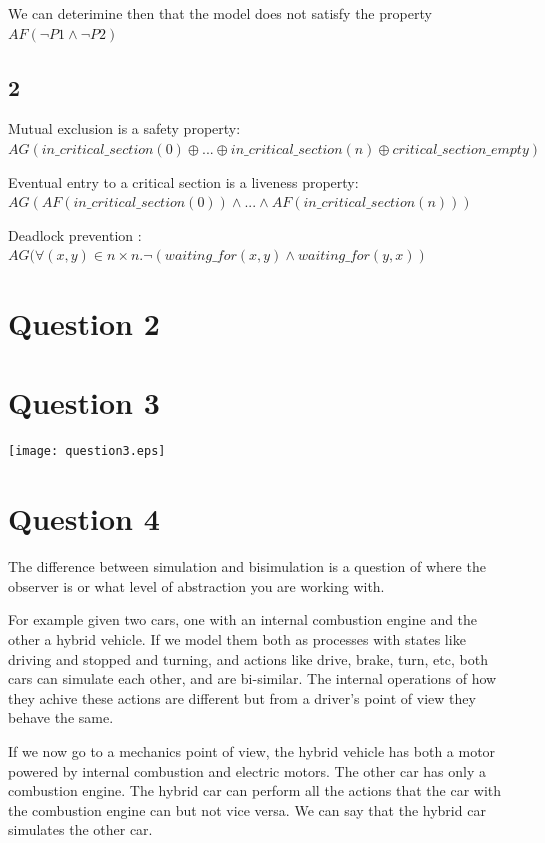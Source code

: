 \documentclass{scrartcl}
\begin{document}
We can deterimine then that the model does not satisfy the property $AF(\neg P1 \wedge \neg P2)$

\subsection{2}
Mutual exclusion is a safety property: 
$AG(in\_critical\_section(0)  \oplus ...\oplus in\_critical\_section(n) \oplus critical\_section\_empty)$

Eventual entry to a critical section is a liveness property: $AG(AF(in\_critical\_section(0)) \wedge ... \wedge AF(in\_critical\_section(n)))$

Deadlock prevention : $AG(\forall (x, y) \in n \times n. \neg (waiting\_for(x, y) \wedge waiting\_for(y, x))$

\section{Question 2}
\section{Question 3}
\texttt{[image: question3.eps]}
\section{Question 4}
The difference between simulation and bisimulation is a question of where the observer is or what level of abstraction you are working with.

For example given two cars, one with an internal combustion engine and the other a hybrid vehicle. If we model them both as processes with states like driving and stopped and turning, and actions like drive, brake, turn, etc, both cars can simulate each other, and are bi-similar. The internal operations of how they achive these actions are different but from a driver's point of view they behave the same.

If we now go to a mechanics point of view, the hybrid vehicle has both a motor powered by internal combustion and electric motors. The other car has only a combustion engine. The hybrid car can perform all the actions that the car with the combustion engine can but not vice versa. We can say that the hybrid car simulates the other car.
\end{document}
